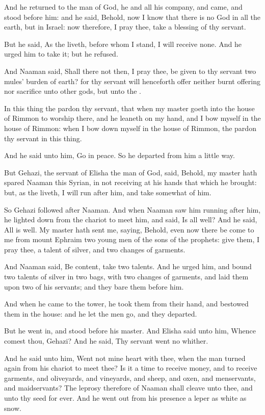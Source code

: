 \Verse And he returned to the man of God, he and all his company, and came, and stood before him: and he said, Behold, now I know that there is no God in all the earth, but in Israel: now therefore, I pray thee, take a blessing of thy servant.

\Verse But he said, As the \LORD liveth, before whom I stand, I will receive none. And he urged him to take it; but he refused.

\Verse And Naaman said, Shall there not then, I pray thee, be given to thy servant two mules' burden of earth? for thy servant will henceforth offer neither burnt offering nor sacrifice unto other gods, but unto the \LORD.

\Verse In this thing the \LORD pardon thy servant, that when my master goeth into the house of Rimmon to worship there, and he leaneth on my hand, and I bow myself in the house of Rimmon: when I bow down myself in the house of Rimmon, the \LORD pardon thy servant in this thing.

\Verse And he said unto him, Go in peace. So he departed from him a little way.

\Verse But Gehazi, the servant of Elisha the man of God, said, Behold, my master hath spared Naaman this Syrian, in not receiving at his hands that which he brought: but, as the \LORD liveth, I will run after him, and take somewhat of him.

\Verse So Gehazi followed after Naaman. And when Naaman saw him running after him, he lighted down from the chariot to meet him, and said, Is all well?  \Verse And he said, All is well. My master hath sent me, saying, Behold, even now there be come to me from mount Ephraim two young men of the sons of the prophets: give them, I pray thee, a talent of silver, and two changes of garments.

\Verse And Naaman said, Be content, take two talents. And he urged him, and bound two talents of silver in two bags, with two changes of garments, and laid them upon two of his servants; and they bare them before him.

\Verse And when he came to the tower, he took them from their hand, and bestowed them in the house: and he let the men go, and they departed.

\Verse But he went in, and stood before his master. And Elisha said unto him, Whence comest thou, Gehazi? And he said, Thy servant went no whither.

\Verse And he said unto him, Went not mine heart with thee, when the man turned again from his chariot to meet thee? Is it a time to receive money, and to receive garments, and oliveyards, and vineyards, and sheep, and oxen, and menservants, and maidservants?  \Verse The leprosy therefore of Naaman shall cleave unto thee, and unto thy seed for ever. And he went out from his presence a leper as white as snow.



